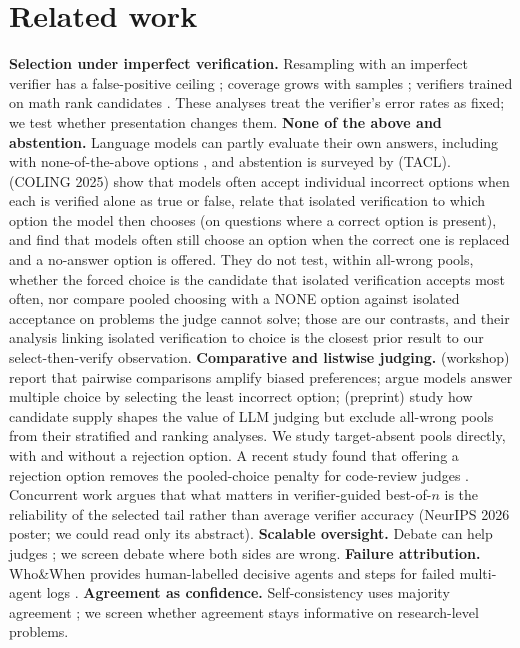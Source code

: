 \documentclass[10pt,twocolumn]{article}
\begin{document}
\section{Related work}
\textbf{Selection under imperfect verification.} Resampling with an imperfect verifier has a false-positive ceiling \citep{stroebl2026limits}; coverage grows with samples \citep{brown2024large}; verifiers trained on math rank candidates \citep{cobbe2021training,lightman2024lets}. These analyses treat the verifier's error rates as fixed; we test whether presentation changes them.
\textbf{None of the above and abstention.} Language models can partly evaluate their own answers, including with none-of-the-above options \citep{kadavath2022language}, and abstention is surveyed by \citet{wen2024know} (TACL). \citet{wang2025llms} (COLING 2025) show that models often accept individual incorrect options when each is verified alone as true or false, relate that isolated verification to which option the model then chooses (on questions where a correct option is present), and find that models often still choose an option when the correct one is replaced and a no-answer option is offered. They do not test, within all-wrong pools, whether the forced choice is the candidate that isolated verification accepts most often, nor compare pooled choosing with a NONE option against isolated acceptance on problems the judge cannot solve; those are our contrasts, and their analysis linking isolated verification to choice is the closest prior result to our select-then-verify observation. \textbf{Comparative and listwise judging.} \citet{jeong2025comparative} (workshop) report that pairwise comparisons amplify biased preferences; \citet{wang2025llms} argue models answer multiple choice by selecting the least incorrect option; \citet{ji2026candidate} (preprint) study how candidate supply shapes the value of LLM judging but exclude all-wrong pools from their stratified and ranking analyses. We study target-absent pools directly, with and without a rejection option. A recent study found that offering a rejection option removes the pooled-choice penalty for code-review judges \citep{halvorsen2026rejection}.
Concurrent work argues that what matters in verifier-guided best-of-$n$ is the reliability of the selected tail rather than average verifier accuracy \citep{zhang2026selected} (NeurIPS 2026 poster; we could read only its abstract). \textbf{Scalable oversight.} Debate can help judges \citep{irving2018ai,khan2024debating,kenton2024scalable}; we screen debate where both sides are wrong. \textbf{Failure attribution.} Who\&When provides human-labelled decisive agents and steps for failed multi-agent logs \citep{zhang2025which}. \textbf{Agreement as confidence.} Self-consistency uses majority agreement \citep{wang2023self}; we screen whether agreement stays informative on research-level problems.
\end{document}
